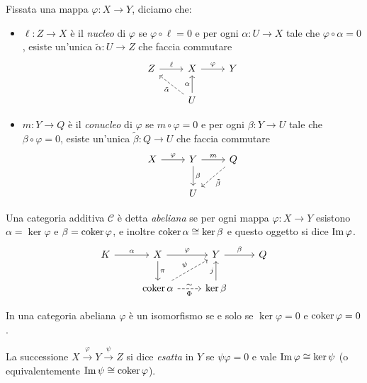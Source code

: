 \begin{definition}
    Fissata una mappa $\varphi: X\to Y$, diciamo che:
    \begin{itemize}
        \item $\ell:Z\to X$ è il \emph{nucleo} di $\varphi$ se $\varphi\circ\ell=0$ e per ogni $\alpha: U\to X$ tale che $\varphi\circ \alpha=0$, esiste un'unica $\tilde\alpha:U\to Z$ che faccia commutare\\
        $$ \begin{tikzcd}
        Z \ar[r, "\ell"] & X \ar[r, "\varphi"] & Y \\
         & U \ar[u,"\alpha"] \ar[ul, dashrightarrow, "\tilde\alpha"]
        \end{tikzcd} $$
        \item $m:Y\to Q$ è il \emph{conucleo} di $\varphi$ se $m\circ\varphi=0$ e per ogni $\beta: Y\to U$ tale che $\beta\circ\varphi=0$, esiste un'unica $\tilde\beta:Q\to U$ che faccia commutare\\
        $$ \begin{tikzcd}
        X \ar[r, "\varphi"] & Y \ar[r, "m"] \ar[d,"\beta"] & Q \ar[dl, dashrightarrow, "\tilde\beta"] \\
        & U 
        \end{tikzcd} $$
    \end{itemize}
\end{definition}

\begin{definition}
    Una categoria additiva $\mathcal{C}$ è detta \emph{abeliana} se per ogni mappa $\varphi: X\to Y$ esistono $\alpha=\ker\varphi$ e $\beta=\operatorname{coker}\varphi$, e inoltre $\operatorname{coker}\alpha\cong\ker\beta$ e questo oggetto si dice $\operatorname{Im}\varphi$.
    $$\begin{tikzcd}
    K \ar[r,"\alpha"] & X \ar[r,"\varphi"] \ar[d, "\pi"] & Y \ar[r,"\beta"] & Q \\
     & \coker\alpha \ar[ur, dashrightarrow, "\psi"] \ar[r, dashrightarrow, "\Phi"',"\sim"] & \ker\beta \ar[u,"j"] &
    \end{tikzcd}$$
\end{definition}

\begin{proposition}
    In una categoria abeliana $\varphi$ è un isomorfismo se e solo se $\ker\varphi=0$ e $\operatorname{coker}\varphi=0$.
\end{proposition}

\begin{definition}
    La successione $X\xrightarrow{\varphi} Y \xrightarrow{\psi} Z$ si dice \emph{esatta} in $Y$ se $\psi\varphi=0$ e vale $\operatorname{Im}\varphi\cong \ker\psi$ (o equivalentemente $\operatorname{Im}\psi\cong\operatorname{coker}\varphi$).
\end{definition}

